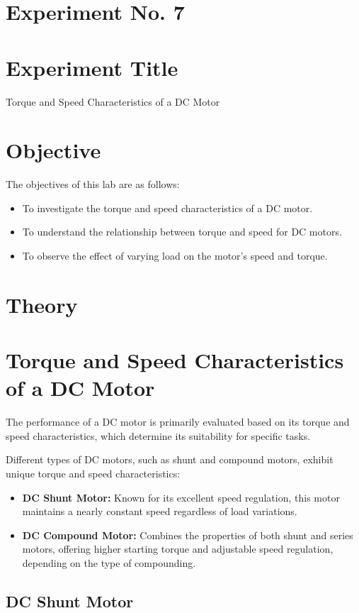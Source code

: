 \documentclass[a4paper,12pt]{article}
\begin{document}
	\section{Experiment No. 7}
	
	\section{Experiment Title }
Torque and Speed Characteristics of a DC Motor
	\section{Objective}
	
	The objectives of this lab are as follows:
	\begin{itemize}
	\item To investigate the torque and speed characteristics of a DC motor.
	\item To understand the relationship between torque and speed for DC motors.
	\item To observe the effect of varying load on the motor's speed and torque.
	\end{itemize}
	
	\section{Theory}
	
	\section*{Torque and Speed Characteristics of a DC Motor}
	 The performance of a DC motor is primarily evaluated based on its torque and speed characteristics, which determine its suitability for specific tasks. 
	

	
	Different types of DC motors, such as shunt and compound motors, exhibit unique torque and speed characteristics:
	\begin{itemize}
		\item \textbf{DC Shunt Motor:} Known for its excellent speed regulation, this motor maintains a nearly constant speed regardless of load variations.
		\item \textbf{DC Compound Motor:} Combines the properties of both shunt and series motors, offering higher starting torque and adjustable speed regulation, depending on the type of compounding.
	\end{itemize}
	\subsection{DC Shunt Motor}
\end{document}
